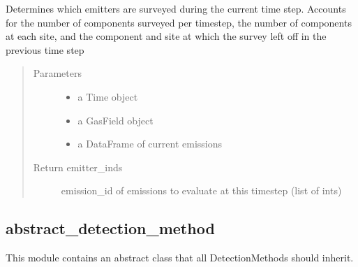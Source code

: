\documentclass[letterpaper,10pt,english]{sphinxmanual}
\begin{document}
\begin{fulllineitems}
\begin{fulllineitems}
\begin{quote}
\begin{description}
\end{description}\end{quote}

\end{fulllineitems}


\begin{fulllineitems}
\label{\detokenize{index:feast.DetectionModules.comp_survey.CompSurvey.emitters_surveyed}}
Determines which emitters are surveyed during the current time step.
Accounts for the number of components surveyed per timestep, the number of components at each site, and the
component and site at which the survey left off in the previous time step
\begin{quote}\begin{description}
\item[{Parameters}] \leavevmode\begin{itemize}
\item {} 
 \textendash{} a Time object

\item {} 
 \textendash{} a GasField object

\item {} 
 \textendash{} a DataFrame of current emissions

\end{itemize}

\item[{Return emitter\_inds}] \leavevmode
emission\_id of emissions to evaluate at this timestep (list of ints)

\end{description}\end{quote}

\end{fulllineitems}


\end{fulllineitems}



\subsection{abstract\_detection\_method}
\label{\detokenize{index:module-feast.DetectionModules.abstract_detection_method}}\label{\detokenize{index:abstract-detection-method}}
This module contains an abstract class that all DetectionMethods should inherit.
\end{document}
